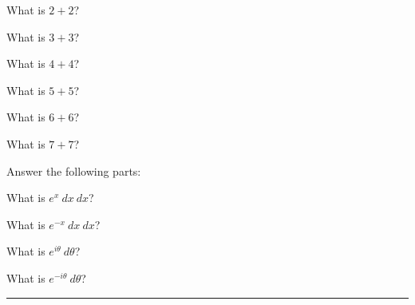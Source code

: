\documentclass[12pt]{exam}%
\begin{document}
\begin{questions}
\begin{multicols}{2}
\question[5] What is \(2+2\)? \answerline%


\question[5] What is \(3+3\)? \answerline%


\question[5] What is \(4+4\)? \answerline%


\question[5] What is \(5+5\)? \answerline%


\question[5] What is \(6+6\)? \answerline%


\question[5] What is \(7+7\)? \answerline%


\question Answer the following parts:

\question[6] What is \(e^{x}\ dx\ dx\)? \answerline%

\question[6] What is \(e^{-x}\ dx\ dx\)? \answerline%

\question[6] What is \(e^{i\theta}\ d\theta\)? \answerline%

\question[6] What is \(e^{-i\theta}\ d\theta\)? \answerline%

\end{multicols}
\end{questions}

\hrule

\begin{center}
\small \cellwidth{1em} \gradetable[h][questions]
\end{center}
\end{document}
